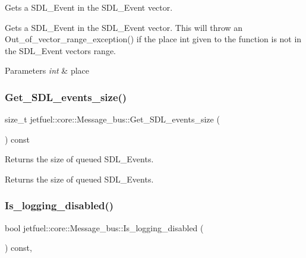 Gets a S\+D\+L\+\_\+\+Event in the S\+D\+L\+\_\+\+Event vector. 

Gets a S\+D\+L\+\_\+\+Event in the S\+D\+L\+\_\+\+Event vector. This will throw an Out\+\_\+of\+\_\+vector\+\_\+range\+\_\+exception() if the place int given to the function is not in the S\+D\+L\+\_\+\+Event vector\textquotesingle{}s range.


\begin{DoxyParams}{Parameters}
{\em int} & place \\
\hline
\end{DoxyParams}
\mbox{\label{classjetfuel_1_1core_1_1Message__bus_aa363b50d4ba99ae86430b5f12610fd39}} 
\subsubsection{\texorpdfstring{Get\+\_\+\+S\+D\+L\+\_\+events\+\_\+size()}{Get\_SDL\_events\_size()}}
{\footnotesize\ttfamily size\+\_\+t jetfuel\+::core\+::\+Message\+\_\+bus\+::\+Get\+\_\+\+S\+D\+L\+\_\+events\+\_\+size (\begin{DoxyParamCaption}{ }\end{DoxyParamCaption}) const\hspace{0.3cm}{\ttfamily [inline]}}



Returns the size of queued S\+D\+L\+\_\+\+Events. 

Returns the size of queued S\+D\+L\+\_\+\+Events. \mbox{\label{classjetfuel_1_1core_1_1Message__bus_ad659ed1f593c8e57ec0308e8bb1f20cb}} 
\subsubsection{\texorpdfstring{Is\+\_\+logging\+\_\+disabled()}{Is\_logging\_disabled()}}
{\footnotesize\ttfamily bool jetfuel\+::core\+::\+Message\+\_\+bus\+::\+Is\+\_\+logging\+\_\+disabled (\begin{DoxyParamCaption}{ }\end{DoxyParamCaption}) const\hspace{0.3cm}{\ttfamily [inline]}, {\ttfamily [protected]}}



